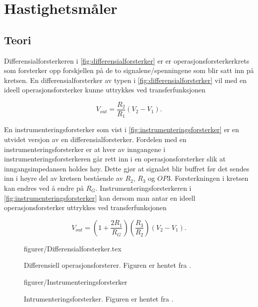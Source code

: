 \section{Hastighetsmåler}
\subsection{Teori}
Differensialforsterkeren i \autoref{fig:differensialforsterker} er er operasjonsforsterkerkrets som forsterker opp forskjellen på de to signalene/spenningene som blir satt inn på kretsen.
En differensialforsterker av typen i \autoref{fig:differensialforsterker} vil med en ideell operasjonsforsterker kunne uttrykkes ved transferfunksjonen \cite{Johnson}

\begin{equation}
    V_{out} = \frac{R_2}{R_1}(V_2-V_1).
    \label{eq:differensialforsterker}
\end{equation}

En instrumenteringsforsterker som vist i \autoref{fig:instrumenteringsforsterker} er en utvidet versjon av en differensialforsterker.
Fordelen med en instrumenteringsforsterker er at hver av inngangene i instrumenteringsforsterkeren går rett inn i en operasjonsforsterker slik at inngangsimpedansen holdes høy.
Dette gjør at signalet blir buffret før det sendes inn i høyre del av kretsen bestående av $R_2$, $R_3$ og $OP3$.
Forsterkningen i kretsen kan endres ved å endre på $R_G$.
Instrumenteringsforsterkeren i \autoref{fig:instrumenteringsforsterker} kan dersom man antar en ideell operasjonsforsterker uttrykkes ved transferfunksjonen \cite{Johnson}

\begin{equation}
    V_{out} = (1+\frac{2R_1}{R_G})(\frac{R_3}{R_2})(V_2-V_1).
    \label{eq:instrumenteringsforsterker}
\end{equation}


\begin{figure} [h]
    \centering
     {figurer/Differensialforsterker.tex}
    \caption{Differensiell operasjonsforsterer. Figuren er hentet fra \cite{Johnson}.}
    \label{fig:differensialforsterker}
\end{figure}


\begin{figure} [h]
    \centering
     {figurer/Instrumenteringsforsterker}
    \caption{Intrumenteringsforsterker. Figuren er hentet fra \cite{Johnson}.}
    \label{fig:instrumenteringsforsterker}
\end{figure}








